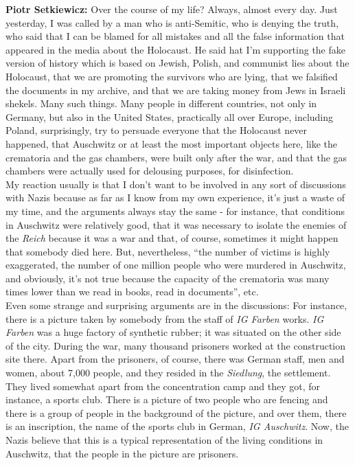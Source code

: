 \textbf{Piotr Setkiewicz:} Over the course of my life? Always, almost every day. Just yesterday, I was called by a man who is anti-Semitic, who is denying the truth, who said that I can be blamed for all mistakes and all the false information that appeared in the media about the Holocaust. He said hat I'm supporting the fake version of history which is based on Jewish, Polish, and communist lies about the Holocaust, that we are promoting the survivors who are lying, that we falsified the documents in my archive, and that we are taking money from Jews in Israeli shekels. Many such things. Many people in different countries, not only in Germany, but also in the United States, practically all over Europe, including Poland, surprisingly, try to persuade everyone that the Holocaust never happened, that Auschwitz or at least the most important objects here, like the crematoria and the gas chambers, were built only after the war, and that the gas chambers were actually used for delousing purposes, for disinfection.\\ 
My reaction usually is that I don't want to be involved in any sort of discussions with Nazis because as far as I know from my own experience, it's just a waste of my time, and the arguments always stay the same - for instance, that conditions in Auschwitz were relatively good, that it was necessary to isolate the enemies of the \textit{Reich} because it was a war and that, of course, sometimes it might happen that somebody died here. But, nevertheless, ``the number of victims is highly exaggerated, the number of one million people who were murdered in Auschwitz, and obviously, it's not true because the capacity of the crematoria was many times lower than we read in books, read in documents'', etc.\\ 
Even some strange and surprising arguments are in the discussions: For instance, there is a picture taken by somebody from the staff of \textit{IG Farben} works. \textit{IG Farben} was a huge factory of synthetic rubber; it was situated on the other side of the city. During the war, many thousand prisoners worked at the construction site there. Apart from the prisoners, of course, there was German staff, men and women, about 7,000 people, and they resided in the \textit{Siedlung}, the settlement. They lived somewhat apart from the concentration camp and they got, for instance, a sports club. There is a picture of two people who are fencing and there is a group of people in the background of the picture, and over them, there is an inscription, the name of the sports club in German, \textit{IG Auschwitz}. Now, the Nazis believe that this is a typical representation of the living conditions in Auschwitz, that the people in the picture are prisoners.\\ 
